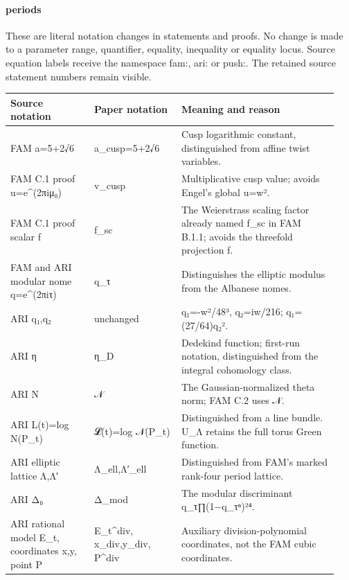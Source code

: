 \paragraph{periods}
These are literal notation changes in statements and proofs. No change is made to a parameter range, quantifier, equality, inequality or equality locus. Source equation labels receive the namespace fam:\allowbreak{}, ari:\allowbreak{} or push:\allowbreak{}. The retained source statement numbers remain visible.
\begingroup\small\setlength{\tabcolsep}{3pt}\begin{longtable}{@{}L{0.24\linewidth}L{0.25\linewidth}L{0.45\linewidth}@{}}\toprule
Source notation & Paper notation & Meaning and reason\\\midrule\endhead
FAM a=5+2√6 & a\_\allowbreak{}cusp=5+2√6 & Cusp logarithmic constant, distinguished from affine twist variables.\\
FAM C.1 proof u=e\textasciicircum{}(2πiμ₀) & v\_\allowbreak{}cusp & Multiplicative cusp value; avoids Engel's global u=w².\\
FAM C.1 proof scalar f & f\_\allowbreak{}sc & The Weierstrass scaling factor already named f\_\allowbreak{}sc in FAM B.1.1; avoids the threefold projection f.\\
FAM and ARI modular nome q=e\textasciicircum{}(2πiτ) & q\_\allowbreak{}τ & Distinguishes the elliptic modulus from the Albanese nomes.\\
ARI q₁,q₂ & unchanged & q₁=-w²/\allowbreak{}48³, q₂=iw/\allowbreak{}216; q₁=(27/\allowbreak{}64)q₂².\\
ARI η & η\_\allowbreak{}D & Dedekind function; first-run notation, distinguished from the integral cohomology class.\\
ARI N & 𝒩 & The Gaussian-normalized theta norm; FAM C.2 uses 𝒩.\\
ARI L(t)=log N(P\_\allowbreak{}t) & 𝓛(t)=log 𝒩(P\_\allowbreak{}t) & Distinguished from a line bundle. U\_\allowbreak{}Λ retains the full torus Green function.\\
ARI elliptic lattice Λ,Λ′ & Λ\_\allowbreak{}ell,Λ′\_\allowbreak{}ell & Distinguished from FAM's marked rank-four period lattice.\\
ARI Δ₀ & Δ\_\allowbreak{}mod & The modular discriminant q\_\allowbreak{}τ∏(1−q\_\allowbreak{}τⁿ)²⁴.\\
ARI rational model E\_\allowbreak{}t, coordinates x,y, point P & E\_\allowbreak{}t\textasciicircum{}div, x\_\allowbreak{}div,y\_\allowbreak{}div, P\textasciicircum{}div & Auxiliary division-polynomial coordinates, not the FAM cubic coordinates.\\

\end{longtable}
